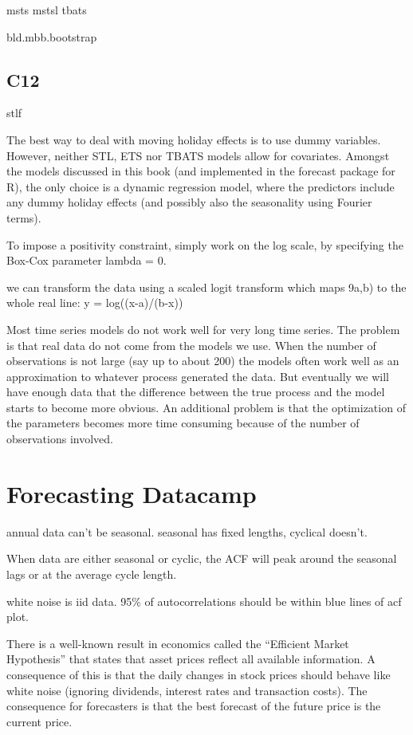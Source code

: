 \documentclass[]{book}
\begin{document}
msts \textbar{} mstsl \textbar{} tbats \textbar{}

bld.mbb.bootstrap

\subsection{C12}\label{c12}

stlf

The best way to deal with moving holiday effects is to use dummy
variables. However, neither STL, ETS nor TBATS models allow for
covariates. Amongst the models discussed in this book (and implemented
in the forecast package for R), the only choice is a dynamic regression
model, where the predictors include any dummy holiday effects (and
possibly also the seasonality using Fourier terms).

To impose a positivity constraint, simply work on the log scale, by
specifying the Box-Cox parameter lambda = 0.

we can transform the data using a scaled logit transform which maps
9a,b) to the whole real line: y = log((x-a)/(b-x))

Most time series models do not work well for very long time series. The
problem is that real data do not come from the models we use. When the
number of observations is not large (say up to about 200) the models
often work well as an approximation to whatever process generated the
data. But eventually we will have enough data that the difference
between the true process and the model starts to become more obvious. An
additional problem is that the optimization of the parameters becomes
more time consuming because of the number of observations involved.

\section{Forecasting Datacamp}\label{forecasting-datacamp}

annual data can't be seasonal. seasonal has fixed lengths, cyclical
doesn't.

When data are either seasonal or cyclic, the ACF will peak around the
seasonal lags or at the average cycle length.

white noise is iid data. 95\% of autocorrelations should be within blue
lines of acf plot.

There is a well-known result in economics called the ``Efficient Market
Hypothesis'' that states that asset prices reflect all available
information. A consequence of this is that the daily changes in stock
prices should behave like white noise (ignoring dividends, interest
rates and transaction costs). The consequence for forecasters is that
the best forecast of the future price is the current price.
\end{document}
